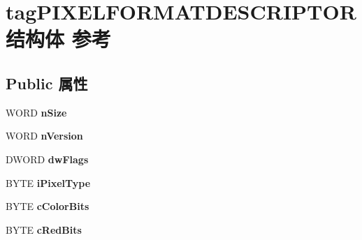 \hypertarget{structtag_p_i_x_e_l_f_o_r_m_a_t_d_e_s_c_r_i_p_t_o_r}{}\section{tag\+P\+I\+X\+E\+L\+F\+O\+R\+M\+A\+T\+D\+E\+S\+C\+R\+I\+P\+T\+O\+R结构体 参考}
\label{structtag_p_i_x_e_l_f_o_r_m_a_t_d_e_s_c_r_i_p_t_o_r}
\subsection*{Public 属性}
\begin{DoxyCompactItemize}
\item 
\mbox{\label{structtag_p_i_x_e_l_f_o_r_m_a_t_d_e_s_c_r_i_p_t_o_r_a3fd20fc2df25cdb6df3b1135aea5aa38}} 
W\+O\+RD {\bfseries n\+Size}
\item 
\mbox{\label{structtag_p_i_x_e_l_f_o_r_m_a_t_d_e_s_c_r_i_p_t_o_r_ab0e1c8071b692ba57391826157e67c84}} 
W\+O\+RD {\bfseries n\+Version}
\item 
\mbox{\label{structtag_p_i_x_e_l_f_o_r_m_a_t_d_e_s_c_r_i_p_t_o_r_ab8dc973cc46f5e342af9b6d86d0b441e}} 
D\+W\+O\+RD {\bfseries dw\+Flags}
\item 
\mbox{\label{structtag_p_i_x_e_l_f_o_r_m_a_t_d_e_s_c_r_i_p_t_o_r_a7d38c8b6cd0f93c6ed644309cf36642b}} 
B\+Y\+TE {\bfseries i\+Pixel\+Type}
\item 
\mbox{\label{structtag_p_i_x_e_l_f_o_r_m_a_t_d_e_s_c_r_i_p_t_o_r_a9fc7a52b0b9f29b97406da534179263e}} 
B\+Y\+TE {\bfseries c\+Color\+Bits}
\item 
\mbox{\label{structtag_p_i_x_e_l_f_o_r_m_a_t_d_e_s_c_r_i_p_t_o_r_a94ec215ded01a4d82368ea4e27405cb3}} 
B\+Y\+TE {\bfseries c\+Red\+Bits}
\item 
\mbox{\label{structtag_p_i_x_e_l_f_o_r_m_a_t_d_e_s_c_r_i_p_t_o_r_a4c1ce470ab69f260f04fd4f2d7bb6b79}} 

\end{DoxyCompactItemize}
